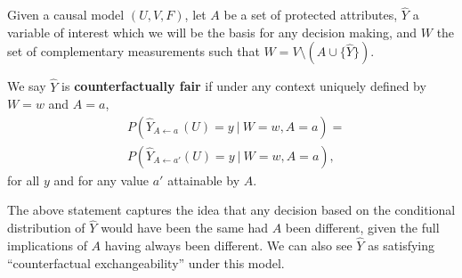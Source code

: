 \begin{figure}[th!]
\end{figure}


Given a causal model $(U, V, F)$, let $A$ be a set of protected
attributes, $\hat Y$ a variable of interest which we will be the basis for
any decision making, and $W$ the set of complementary measurements such that
$W= V \setminus ( A \cup \{\hat Y\})$.
\begin{define}
We say $\hat Y$ is {\bf counterfactually fair}
if under any context uniquely defined by $W = w$ and $A = a$,
  \label{eq:cf_definition}
\begin{align}
  &P(\hat Y_{A \leftarrow a\ }(U) = y\ |\ W = w, A = a)  =\nonumber\\ 
  &P(\hat Y_{A \leftarrow a'}(U) = y\ |\ W = w, A = a), 
\end{align}
for all $y$ and for any value $a'$ attainable by $A$.
\end{define}
The above statement captures the idea that any decision based on the
conditional distribution of $\hat Y$ would have been the same had $A$ been
different, given the full implications of $A$ having always been different.
We can also see $\hat Y$ as satisfying ``counterfactual exchangeability''
under this model.

